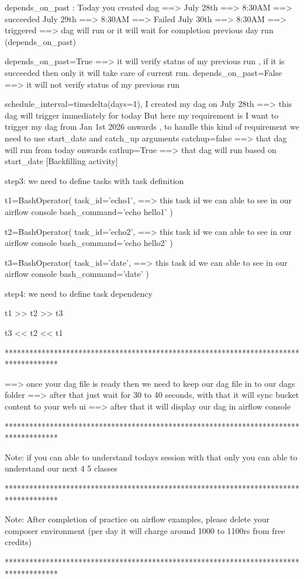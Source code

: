 depends_on_past :
	Today you created dag ==> July 28th ==> 8:30AM ==> succeeded
							  July 29th ==> 8:30AM ==> Failed
							  July 30th ==> 8:30AM ==> triggered ==> dag will run or it will wait for completion previous day run (depends_on_past)

depends_on_past=True ==> it will verify status of my previous run , if it is succeeded then only it will take care of current run.
depends_on_past=False ==> it will not verify status of my previous run 


schedule_interval=timedelta(days=1), 
	I created my dag on July 28th ==> this dag will trigger immediately for today 
	But here my requirement is I want to trigger my dag from Jan 1st 2026 onwards , to handle this kind of requirement we need to use start_date and catch_up arguments
	catchup=false ==> that dag will run from today onwards
	cathup=True ==> that dag will run based on start_date  [Backfilling activity]

step3: we need to define tasks with task definition

t1=BashOperator(
task_id='echo1', ==> this task id we can able to see in our airflow console
bash_command='echo hello1'
)

t2=BashOperator(
task_id='echo2', ==> this task id we can able to see in our airflow console
bash_command='echo hello2'
)

t3=BashOperator(
task_id='date', ==> this task id we can able to see in our airflow console
bash_command='date'
)

step4: we need to define task dependency

t1 >> t2 >> t3 

t3 << t2 << t1

*************************************************************************************

==> once your dag file is ready then we need to keep our dag file in to our dags folder
==> after that just wait for 30 to 40 seconds, with that it will sync bucket content to your web ui ==> after that it will display our dag in airflow console 

*************************************************************************************

Note: if you can able to understand todays session with that only you can able to understand our next 4 5 classes

*************************************************************************************

Note: After completion of practice on airflow examples, please delete your composer environment (per day it will charge around 1000 to 1100rs from free credits)

*************************************************************************************
